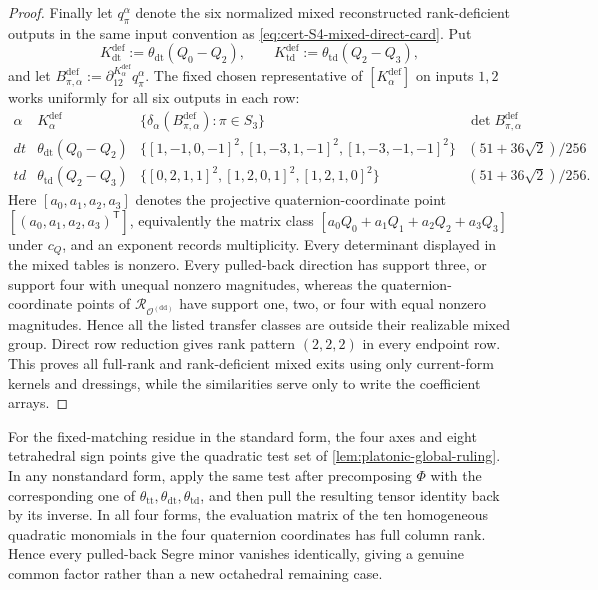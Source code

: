 \documentclass[11pt,letterpaper,onecolumn]{article}
\theoremstyle{plain}
\theoremstyle{definition}
\theoremstyle{remark}
\newcommand{\OctDD}{{\mathcal O^{(\mathrm{dd})}}}
\begin{document}
\begin{proof}
Finally let \(q_\pi^\alpha\) denote the six normalized mixed reconstructed
rank-deficient outputs in the same input convention as
\cref{eq:cert-S4-mixed-direct-card}.  Put
\[
 K_{\mathrm{dt}}^{\mathrm{def}}:=\theta_{\mathrm{dt}}(Q_0-Q_2),
 \qquad
 K_{\mathrm{td}}^{\mathrm{def}}:=\theta_{\mathrm{td}}(Q_2-Q_3),
\]
and let
\(B_{\pi,\alpha}^{\mathrm{def}}
 :=\partial_{12}^{K_\alpha^{\mathrm{def}}}q_\pi^\alpha\).
The fixed chosen representative of \([K_\alpha^{\mathrm{def}}]\) on inputs
\(1,2\) works uniformly for all six outputs in each row:
\begin{equation*}
\begin{array}{c|c|c|c}
\alpha&K_\alpha^{\mathrm{def}}&
 \{\delta_\alpha(B_{\pi,\alpha}^{\mathrm{def}}):\pi\in S_3\}
 &\det B_{\pi,\alpha}^{\mathrm{def}}\\ \hline
dt&\theta_{\mathrm{dt}}(Q_0-Q_2)&
 \{[1,-1,0,-1]^2,[1,-3,1,-1]^2,[1,-3,-1,-1]^2\}&
 (51+36\sqrt2)/256\\
td&\theta_{\mathrm{td}}(Q_2-Q_3)&
 \{[0,2,1,1]^2,[1,2,0,1]^2,[1,2,1,0]^2\}&
 (51+36\sqrt2)/256.
\end{array}
\end{equation*}
Here \([a_0,a_1,a_2,a_3]\) denotes the projective quaternion-coordinate
point \([(a_0,a_1,a_2,a_3)^{\mathsf T}]\), equivalently the matrix class
\([a_0Q_0+a_1Q_1+a_2Q_2+a_3Q_3]\) under \(c_Q\), and an exponent records
multiplicity.  Every determinant displayed in the mixed tables is nonzero.
Every pulled-back direction has support three, or support four with unequal
nonzero magnitudes, whereas the quaternion-coordinate points of
\(\mathcal R_{\OctDD}\) have support one, two, or four with equal nonzero
magnitudes.  Hence all the listed transfer
classes are outside their realizable mixed group.  Direct row reduction gives
rank pattern \((2,2,2)\) in every endpoint row.  This proves all full-rank
and rank-deficient mixed exits using only current-form kernels and
dressings, while the similarities serve only to write the coefficient
arrays.
\end{proof}

For the fixed-matching residue in the standard form, the four axes and
eight tetrahedral sign points give the quadratic test set of
\cref{lem:platonic-global-ruling}.  In any nonstandard form, apply the same
test after precomposing \(\Phi\) with the corresponding one of
\(\theta_{\mathrm{tt}},\theta_{\mathrm{dt}},\theta_{\mathrm{td}}\), and then pull the resulting
tensor identity back by its inverse.    In all four forms, the evaluation
matrix of the ten homogeneous quadratic
 monomials in the four quaternion coordinates has full column rank.  Hence
 every pulled-back Segre minor vanishes identically, giving a genuine
common factor rather than a new octahedral remaining case.
\end{document}
